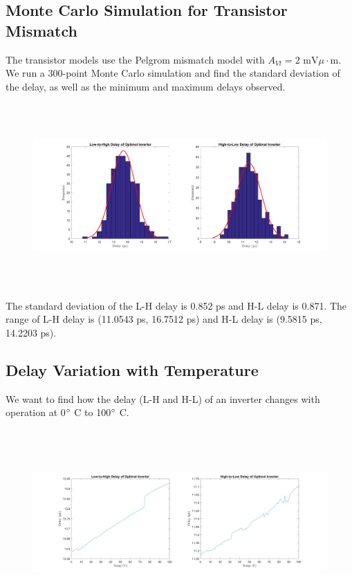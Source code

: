 \documentclass[11pt]{article}
\begin{document}
\subsection{Monte Carlo Simulation for Transistor Mismatch}
The transistor models use the Pelgrom mismatch model with $A_{Vt} = 2 \text{ mV} \mu \cdot \text{m}$. We run a 300-point Monte Carlo simulation and find the standard deviation of the delay, as well as the minimum and maximum delays observed.

\begin{figure}[H]
	\centerline{\includegraphics[height=7cm]{images/monte_carlo_histogram.png}}
\end{figure}

The standard deviation of the L-H delay is 0.852 ps and H-L delay is 0.871. The range of L-H delay is (11.0543 ps, 16.7512 ps) and H-L delay is (9.5815 ps, 14.2203 ps).

\subsection{Delay Variation with Temperature}
We want to find how the delay (L-H and H-L) of an inverter changes with operation at 0$\degree$ C to 100$\degree$ C.

\begin{figure}[H]
	\centerline{\includegraphics[height=7cm]{images/temp_variation.png}}
\end{figure}
\end{document}
